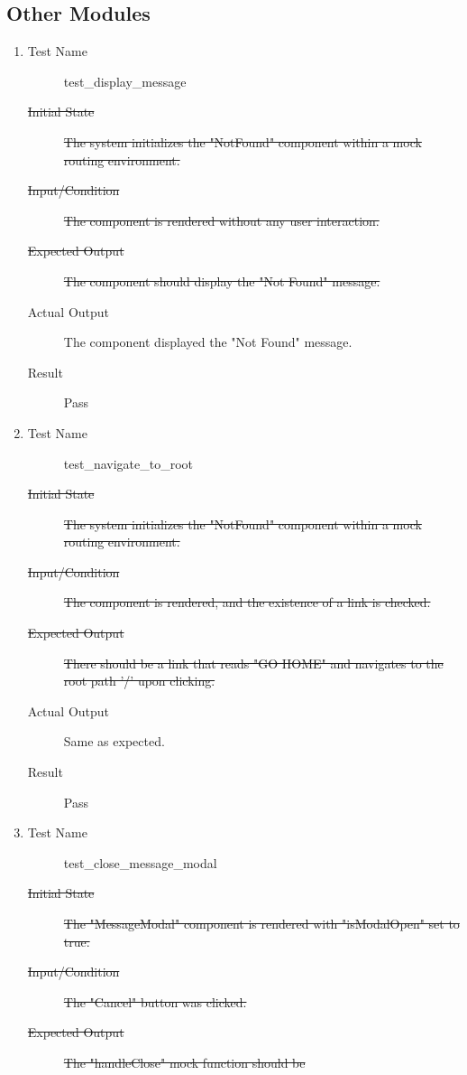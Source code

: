 \documentclass[12pt, titlepage]{article}
\begin{document}
\subsection{Other Modules}
\begin{enumerate}[UT-OT1]
\item \label{UT-OT1}
  \begin{description}
  \item[Test Name] test\_display\_message
  \item[\sout{Initial State}] \sout{The system initializes the "NotFound" component
      within a mock routing environment.}
  \item[\sout{Input/Condition}] \sout{The component is rendered without any user
      interaction.}
  \item[\sout{Expected Output}] \sout{The component should display the "Not Found"
      message.}
  \item[Actual Output] The component displayed the "Not Found" message.
  \item[Result] Pass
  \end{description}
\item \label{UT-OT2}
  \begin{description}
  \item[Test Name] test\_navigate\_to\_root
  \item[\sout{Initial State}] \sout{The system initializes the "NotFound" component
      within a mock routing environment.}
  \item[\sout{Input/Condition}] \sout{The component is rendered, and the existence
      of a link is checked.}
  \item[\sout{Expected Output}] \sout{There should be a link that reads "GO HOME"
      and navigates to the root path '/' upon clicking.}
  \item[Actual Output] Same as expected.
  \item[Result] Pass
  \end{description}
\item \label{UT-OT3}
  \begin{description}
  \item[Test Name] test\_close\_message\_modal
  \item[\sout{Initial State}] \sout{The "MessageModal" component is rendered with
      "isModalOpen" set to true.}
  \item[\sout{Input/Condition}] \sout{The "Cancel" button was clicked.}
  \item[\sout{Expected Output}] \sout{The "handleClose" mock function should be
}
\end{description}
\end{enumerate}
\end{document}
